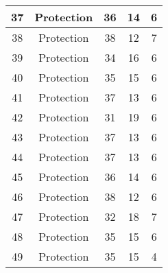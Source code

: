 \documentclass[results.tex]{subfiles}
\begin{document}
\begin{center}
\begin{tabular}{| c || c | c | c | c |}
            \hline
            37                      & Protection                   & 36                     & 14                      & 6                    \\
            \hline
            38                      & Protection                   & 38                     & 12                      & 7                    \\
            \hline
            39                      & Protection                   & 34                     & 16                      & 6                    \\
            \hline
            40                      & Protection                   & 35                     & 15                      & 6                    \\
            \hline
            41                      & Protection                   & 37                     & 13                      & 6                    \\
            \hline
            42                      & Protection                   & 31                     & 19                      & 6                    \\
            \hline
            43                      & Protection                   & 37                     & 13                      & 6                    \\
            \hline
            44                      & Protection                   & 37                     & 13                      & 6                    \\
            \hline
            45                      & Protection                   & 36                     & 14                      & 6                    \\
            \hline
            46                      & Protection                   & 38                     & 12                      & 6                    \\
            \hline
            47                      & Protection                   & 32                     & 18                      & 7                    \\
            \hline
            48                      & Protection                   & 35                     & 15                      & 6                    \\
            \hline
            49                      & Protection                   & 35                     & 15                      & 4                    \\
            \hline
        \end{tabular}
    \end{center}
\end{document}
